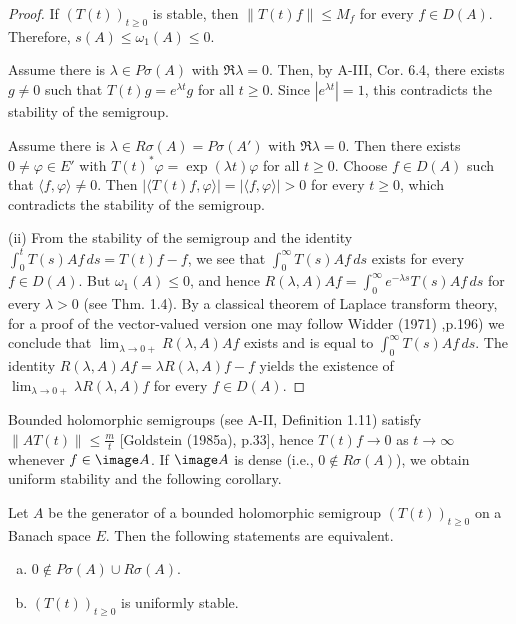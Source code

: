 \begin{proof} If \( (T(t))_{t \geq 0} \) is stable, then \( \|T(t) f\| \leq M_f \) for every \( f \in D(A) \). Therefore, \( s(A) \leq \omega_1(A) \leq 0 \). 

\noindent Assume there is \( \lambda \in P\sigma(A) \) with \( \Re \lambda = 0 \). Then, by A-III, Cor. 6.4, there exists \( g \neq 0 \) such that \( T(t) g = e^{\lambda t} g \) for all \( t \geq 0 \). Since \( |e^{\lambda t}| = 1 \), this contradicts the stability of the semigroup. 

\noindent Assume there is \( \lambda \in R\sigma(A) = P\sigma(A') \) with \( \Re \lambda = 0 \). Then there exists \( 0 \neq \varphi \in E' \) with \( T(t)^* \varphi = \exp(\lambda t) \varphi \) for all \( t \geq 0 \). Choose \( f \in D(A) \) such that \( \langle f, \varphi \rangle \neq 0 \). Then \( |\langle T(t) f, \varphi \rangle| = | \langle f, \varphi \rangle| > 0 \) for every \( t \geq 0 \), which contradicts the stability of the semigroup.

\medskip
\noindent
(ii) From the stability of the semigroup and the identity   \(\int_{0}^{t} T(s) A f \, ds = T(t) f - f\), we see that  
\(\int_{0}^{\infty} T(s) A f \, ds\) exists for every \( f \in D(A) \).  
But \( \omega_1(A) \leq 0 \), and hence  
\( R(\lambda, A) A f = \int_{0}^{\infty} e^{-\lambda s} T(s) A f \, ds \) for every \( \lambda > 0 \) (see Thm. 1.4). By a classical theorem of Laplace transform theory, for a proof of the vector-valued version one may follow Widder (1971) ,p.196) we conclude that $\lim_{\lambda \to 0+} R(\lambda,A)Af$ exists
and is equal to $\int_{0}^{\infty} T(s)Af \, ds$. 
The identity $R(\lambda,A)Af = \lambda R(\lambda,A)f - f$
yields the existence of $\lim_{\lambda \to 0+} \lambda R(\lambda,A)f$ for every $f \in D(A)$.
\end{proof}
\noindent
Bounded holomorphic semigroups (see A-II, Definition 1.11) satisfy
$\|AT(t)\| \leq \frac{m}{t}$ [Goldstein (1985a), p.33], hence $T(t)f \to 0$ as $t \to \infty$
whenever $f \in \image A$. 
If $\image A$ is dense (i.e., $0 \not\in R\sigma(A)$), we obtain
uniform stability and the following corollary.

\begin{corollary}\label{cor:a4-1.14}
Let $A$ be the generator of a bounded holomorphic
semigroup $(T(t))_{t \geq 0}$ on a Banach space $E$. 
Then the following statements are equivalent.
\begin{enumerate}[(a)]
\item $0 \not\in P\sigma(A) \cup R\sigma(A)$.
\item $(T(t))_{t \geq 0}$ is uniformly stable.
\end{enumerate}
\end{corollary}

